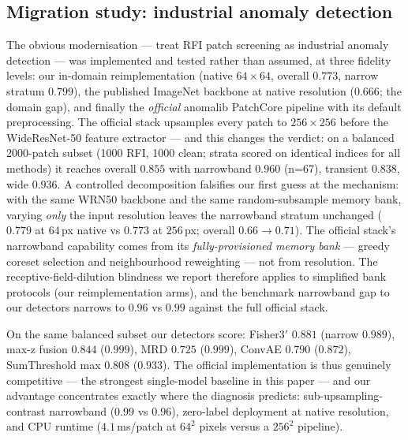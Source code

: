 \documentclass[journal]{IEEEtran}
\begin{document}
\subsection{Migration study: industrial anomaly detection}
\label{sec:migration}
The obvious modernisation --- treat RFI patch screening as industrial
anomaly detection --- was implemented and tested rather than assumed, at
three fidelity levels: our in-domain reimplementation (native $64{\times}64$,
overall $0.773$, narrow stratum $0.799$), the published ImageNet backbone at
native resolution ($0.666$; the domain gap), and finally the \emph{official}
anomalib PatchCore pipeline with its default preprocessing.  The official
stack upsamples every patch to $256{\times}256$ before the WideResNet-50
feature extractor --- and this changes the verdict: on a balanced
2000-patch subset (1000 RFI, 1000 clean; strata scored on identical
indices for all methods) it reaches overall $0.855$ with narrowband
$0.960$ (n=67), transient $0.838$, wide $0.936$.  A controlled decomposition falsifies our first guess at the
mechanism: with the same WRN50 backbone and the same
random-subsample memory bank, varying \emph{only} the input resolution
leaves the narrowband stratum unchanged ($0.779$ at $64$\,px native vs
$0.773$ at $256$\,px; overall $0.66\to0.71$).  The official stack's
narrowband capability comes from its \emph{fully-provisioned memory
bank} --- greedy coreset selection and neighbourhood reweighting --- not
from resolution.  The receptive-field-dilution blindness we report
therefore applies to simplified bank protocols (our reimplementation
arms), and the benchmark narrowband gap to our detectors narrows to
$0.96$ vs $0.99$ against the full official stack.

On the same balanced subset our detectors score: Fisher3$'$ $0.881$
(narrow $0.989$), max-z fusion $0.844$ ($0.999$), MRD $0.725$ ($0.999$),
ConvAE $0.790$ ($0.872$), SumThreshold max $0.808$ ($0.933$).  The
official implementation is thus genuinely competitive --- the strongest
single-model baseline in this paper --- and our advantage concentrates
exactly where the diagnosis predicts: sub-upsampling-contrast narrowband
($0.99$ vs $0.96$), zero-label deployment at native resolution, and CPU
runtime ($4.1$\,ms/patch at $64^2$ pixels versus a $256^2$ pipeline).
\end{document}
